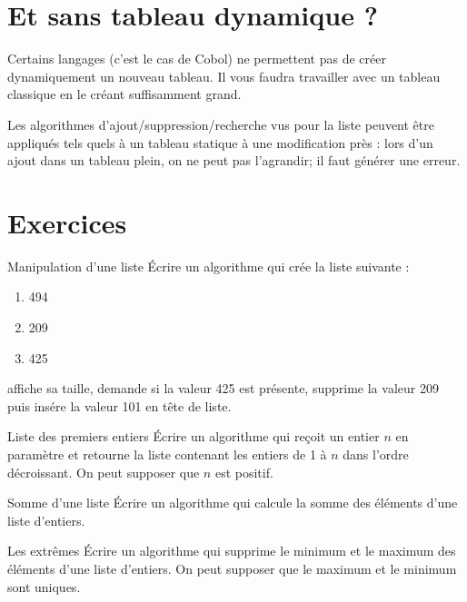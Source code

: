 	
	\section{Et sans tableau dynamique ?}
	
		Certains langages (c’est le cas de Cobol) ne permettent pas de créer
		dynamiquement un nouveau tableau. Il vous faudra travailler avec un
		tableau classique en le créant suffisamment grand.
			
		Les algorithmes d’ajout/suppression/recherche vus pour la liste peuvent
		être appliqués tels quels à un tableau statique à une modification près
		: lors d’un ajout dans un tableau plein, on ne peut pas l’agrandir; il
		faut générer une erreur.
	
	\section{Exercices}
	
		\begin{Exercice}{Manipulation d'une liste}
			Écrire un algorithme qui crée la liste suivante :
			\begin{enumerate}[start=0]
			\item 494
			\item 209
			\item 425
			\end{enumerate}
			affiche sa taille, demande si la valeur 425 est présente, 
			supprime la valeur 209 puis insére la valeur 101 en tête de liste.
		\end{Exercice}
		
		\begin{Exercice}{Liste des premiers entiers}
			Écrire un algorithme qui reçoit un entier $n$ en paramètre et retourne la
			liste contenant les entiers de 1 à $n$ dans l'ordre
			décroissant. On peut supposer que $n$ est positif.
		\end{Exercice}
			
		\begin{Exercice}{Somme d'une liste}
			Écrire un algorithme qui calcule la somme des éléments d’une liste
			d’entiers.
		\end{Exercice}
		
		\begin{Exercice}{Les extrêmes}
				Écrire un algorithme qui supprime le minimum et le maximum des éléments
				d’une liste d’entiers. On peut supposer que le maximum et le minimum
				sont uniques.
		\end{Exercice}
		
